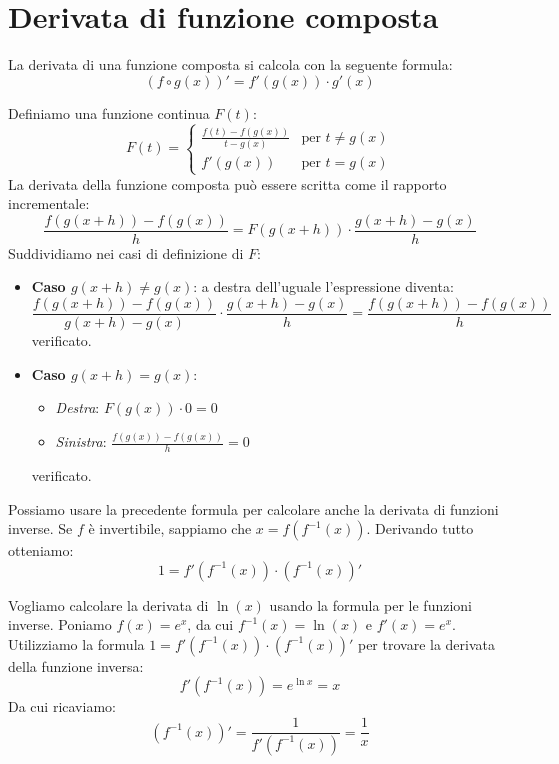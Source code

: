 \documentclass[12pt]{report}
\begin{document}
	\section{Derivata di funzione composta}
	
	La derivata di una funzione composta si calcola con la seguente formula:
	\[
	(f \circ g(x))' = f'(g(x)) \cdot g'(x)
	\]
	
	\begin{dimostrazione}{}{}
		
		Definiamo una funzione continua $F(t)$:
		\[
		F(t) = \begin{cases}
			\frac{f(t) - f(g(x))}{t - g(x)} & \text{per } t \neq g(x) \\
			f'(g(x)) & \text{per } t = g(x)
		\end{cases}
		\]
		La derivata della funzione composta può essere scritta come il rapporto incrementale:
		\[
		\frac{f(g(x+h)) - f(g(x))}{h} = F(g(x+h)) \cdot \frac{g(x+h) - g(x)}{h}
		\]
		Suddividiamo nei casi di definizione di $F$:
		\begin{itemize}
			
			\item \textbf{Caso $g(x+h) \neq g(x)$}: a destra dell'uguale l'espressione diventa:
			\[
			\frac{f(g(x+h)) - f(g(x))}{g(x+h) - g(x)} \cdot \frac{g(x+h) - g(x)}{h} = \frac{f(g(x+h)) - f(g(x))}{h}
			\]
			verificato.
			
			\item \textbf{Caso $g(x+h) = g(x)$}:
			\begin{itemize}
				
				\item \textit{Destra}: $F(g(x)) \cdot 0 = 0$
				
				\item \textit{Sinistra}: $\frac{f(g(x)) - f(g(x))}{h} = 0$
				
			\end{itemize}
			
			verificato.
			
		\end{itemize}
		
	\end{dimostrazione}
	
	Possiamo usare la precedente formula per calcolare anche la derivata di funzioni inverse.
	Se $f$ è invertibile, sappiamo che $x = f(f^{-1}(x))$. Derivando tutto otteniamo:
	\[
	1 = f'(f^{-1}(x)) \cdot (f^{-1}(x))'
	\]
	
	\begin{osservazione}{}{}
		
		Vogliamo calcolare la derivata di $\ln(x)$ usando la formula per le funzioni inverse.
		Poniamo $f(x) = e^x$, da cui $f^{-1}(x) = \ln(x)$ e $f'(x) = e^x$.
		Utilizziamo la formula $1 = f'(f^{-1}(x)) \cdot (f^{-1}(x))'$ per trovare la derivata della funzione inversa:
		\[
		f'(f^{-1}(x)) = e^{\ln x} = x
		\]
		Da cui ricaviamo:
		\[
		(f^{-1}(x))' = \frac{1}{f'(f^{-1}(x))} = \frac{1}{x}
		\]
		
	\end{osservazione}
	
\end{document}

